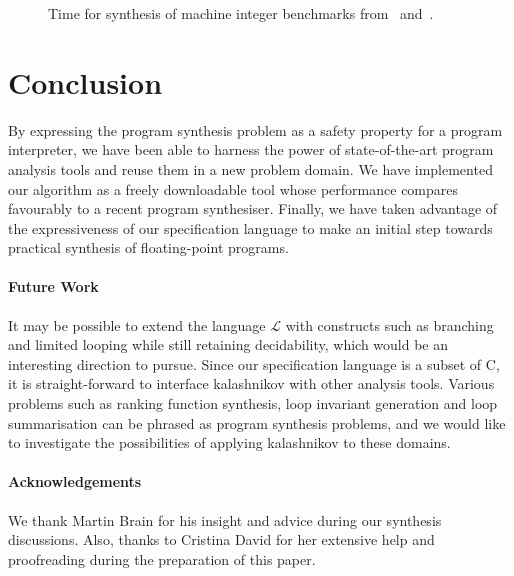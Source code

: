 \documentclass[a4paper]{llncs}
\begin{document}
\begin{figure}[ht]
\centering
{\tiny

}
\caption{Time for synthesis of machine integer benchmarks from~\cite{brahma} and~\cite{brahma-icse}.
 \label{fig:results-table}}
\end{figure}

%



\section{Conclusion}

By expressing the program synthesis problem as a safety property for a
program interpreter, we have been able to harness the power of
state-of-the-art program analysis tools and reuse them in a new problem
domain.  We have implemented our algorithm as a freely downloadable tool
whose performance compares favourably to a recent program synthesiser. 
Finally, we have taken advantage of the expressiveness of our specification
language to make an initial step towards practical synthesis of
floating-point programs.

\paragraph{Future Work}

It may be possible to extend the language $\mathcal{L}$ with constructs such
as branching and limited looping while still retaining decidability, which
would be an interesting direction to pursue.  Since our specification
language is a subset of C, it is straight-forward to interface {\sc
kalashnikov} with other analysis tools.  Various problems such as ranking
function synthesis, loop invariant generation and loop
summarisation can be phrased as program synthesis problems, and we would like to investigate the
possibilities of applying {\sc kalashnikov} to these domains.

\paragraph{Acknowledgements}
We thank Martin Brain for his insight and advice during our synthesis discussions.
Also, thanks to Cristina David for her extensive help and proofreading during the
preparation of this paper.
\end{document}

